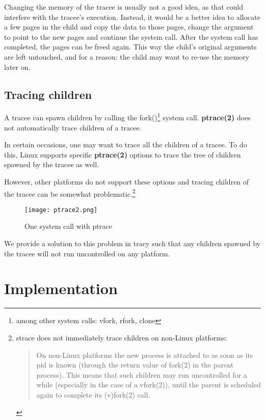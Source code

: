 \documentclass[a4paper, twoside, 10pt, twocolumn]{report}
\begin{document}
Changing the memory of the tracee is usually not a good idea, as that could
interfere with the tracee's execution.
Instead, it would be a better idea to allocate a few pages in the
child and copy the data to those pages, change the argument to point to the new
pages and continue the system call. After the system call has completed, the
pages can be freed again. This way the child's original arguments are left
untouched, and for a reason: the child may want to re-use the memory later on.

\section{Tracing children}

A tracee can spawn children by calling the fork()\footnote{among other system
calls: vfork, rfork, clone} system call. \textbf{ptrace(2)} does not
automatically trace children of a tracee.

In certain occasions, one may want to trace all the children of a tracee.
To do this, Linux supports specific \textbf{ptrace(2)} options to trace
the tree of children spawned by the tracee as well.

However, other platforms do not support these options and tracing
children of the tracee can be somewhat problematic.\footnote{strace does not
immediately trace children on non-Linux platforms:
\begin{quote}
    On non-Linux platforms the new process is attached to as soon as its pid is
    known (through the return value of fork(2) in the parent process).
    This means that such children may run uncontrolled for a while
    (especially in the case of a vfork(2)), until the parent is scheduled
    again to complete its (v)fork(2)  call.
\end{quote}
}

\begin{figure}
\label{fig2}
\texttt{[image: ptrace2.png]}
\caption{One system call with ptrace}
\end{figure}

We provide a solution to this problem in tracy such that any children spawned
by the tracee will not run uncontrolled on any platform.

\chapter{Implementation}
\end{document}
